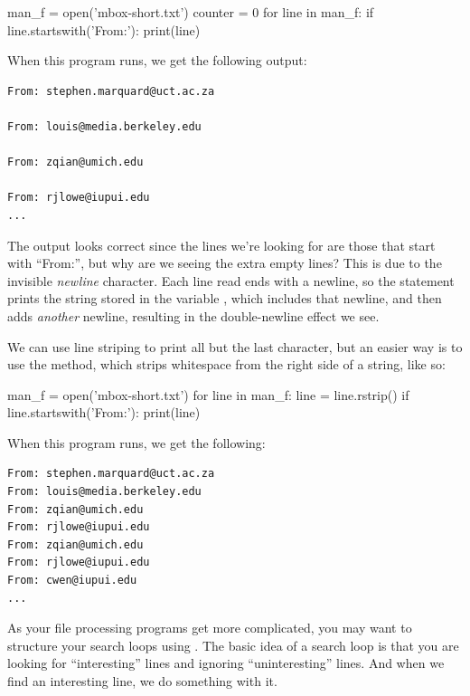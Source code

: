 \begin{python}[frame=single]
man_f = open('mbox-short.txt')
counter = 0
for line in man_f:
    if line.startswith('From:'):
        print(line)
\end{python}

When this program runs, we get the following output:

\begin{Verbatim}[frame=single]
From: stephen.marquard@uct.ac.za

From: louis@media.berkeley.edu

From: zqian@umich.edu

From: rjlowe@iupui.edu
...
\end{Verbatim}

The output looks correct since the lines we're looking for are those that start with ``From:'', but why are we seeing the extra empty lines? This is due to the invisible \emph{newline} character. Each line read ends with a newline, so the  statement prints the string stored in the variable , which includes that newline, and then  adds \emph{another} newline, resulting in the double-newline effect we see.

We can use line striping to print all but the last character, but an easier way is to use the  method, which strips whitespace from the right side of a string, like so:

\begin{python}[frame=single]
man_f = open('mbox-short.txt')
for line in man_f:
    line = line.rstrip()
    if line.startswith('From:'):
        print(line)
\end{python}

When this program runs, we get the following:

\begin{Verbatim}[frame=single]
From: stephen.marquard@uct.ac.za
From: louis@media.berkeley.edu
From: zqian@umich.edu
From: rjlowe@iupui.edu
From: zqian@umich.edu
From: rjlowe@iupui.edu
From: cwen@iupui.edu
...
\end{Verbatim}

As your file processing programs get more complicated, you may want to structure your search loops using . The basic idea of a search loop is that you are looking for ``interesting'' lines and ignoring ``uninteresting'' lines. And when we find an interesting line, we do something with it.

